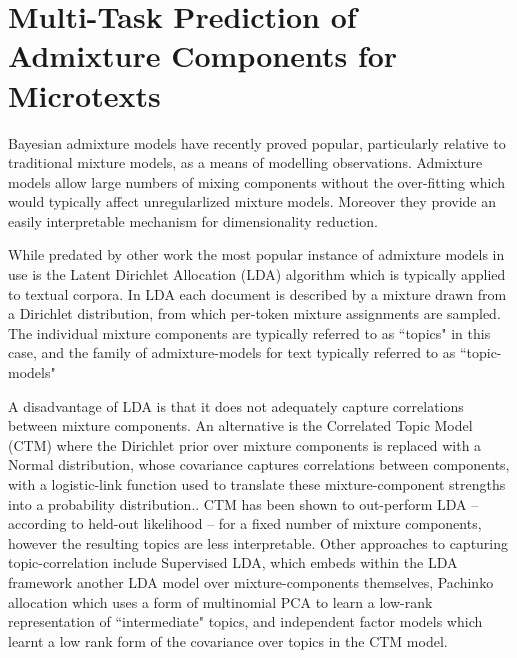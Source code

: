 

\tableofcontents

\section{Multi-Task Prediction of Admixture Components for Microtexts}
Bayesian admixture models have recently proved popular, particularly relative to traditional mixture models, as a means of modelling observations. Admixture models allow large numbers of mixing components without the over-fitting which would typically affect unregularlized mixture models. Moreover they provide an easily interpretable mechanism for dimensionality reduction.

While predated by other work\cite{Pritchard2000} the most popular instance of admixture models in use is the Latent Dirichlet Allocation (LDA) algorithm\cite{Blei2003} which is typically applied to textual corpora. In LDA each document is described by a mixture drawn from a Dirichlet distribution, from which per-token mixture assignments are sampled. The individual mixture components are typically referred to as ``topics" in this case, and the family of admixture-models for text typically referred to as ``topic-models"

A disadvantage of LDA is that it does not adequately capture correlations between mixture components. An alternative is the Correlated Topic Model (CTM) where the Dirichlet prior over mixture components is replaced with a Normal distribution, whose covariance captures correlations between components, with a logistic-link function used to translate these mixture-component strengths into a probability distribution.\cite{Blei2006}. CTM has been shown to out-perform LDA -- according to held-out likelihood -- for a fixed number of mixture components, however the resulting topics are less interpretable\cite{Chang2009}. Other approaches to capturing topic-correlation include Supervised LDA\cite{Rubin2011}, which embeds within the LDA framework another LDA model over mixture-components themselves, Pachinko allocation \cite{Li2006} which uses a form of multinomial PCA\cite{Buntine2002} to learn a low-rank representation of ``intermediate" topics, and independent factor models\cite{Putthividhya2009} which learnt a low rank form of the covariance over topics in the CTM model.

